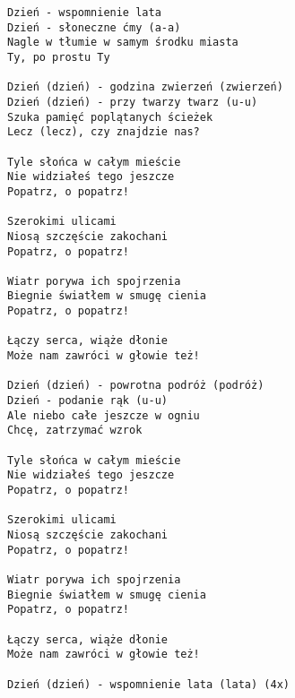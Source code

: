 \documentclass[12pt]{article}
\begin{document}
\begin{verbatim}
Dzień - wspomnienie lata
Dzień - słoneczne ćmy (a-a)
Nagle w tłumie w samym środku miasta
Ty, po prostu Ty

Dzień (dzień) - godzina zwierzeń (zwierzeń)
Dzień (dzień) - przy twarzy twarz (u-u)
Szuka pamięć poplątanych ścieżek
Lecz (lecz), czy znajdzie nas?

Tyle słońca w całym mieście
Nie widziałeś tego jeszcze
Popatrz, o popatrz!

Szerokimi ulicami
Niosą szczęście zakochani
Popatrz, o popatrz!

Wiatr porywa ich spojrzenia
Biegnie światłem w smugę cienia
Popatrz, o popatrz!

Łączy serca, wiąże dłonie
Może nam zawróci w głowie też!

Dzień (dzień) - powrotna podróż (podróż)
Dzień - podanie rąk (u-u)
Ale niebo całe jeszcze w ogniu
Chcę, zatrzymać wzrok

Tyle słońca w całym mieście
Nie widziałeś tego jeszcze
Popatrz, o popatrz!

Szerokimi ulicami
Niosą szczęście zakochani
Popatrz, o popatrz!

Wiatr porywa ich spojrzenia
Biegnie światłem w smugę cienia
Popatrz, o popatrz!

Łączy serca, wiąże dłonie
Może nam zawróci w głowie też!

Dzień (dzień) - wspomnienie lata (lata) (4x)
\end{verbatim}
\clearpage
\end{document}
